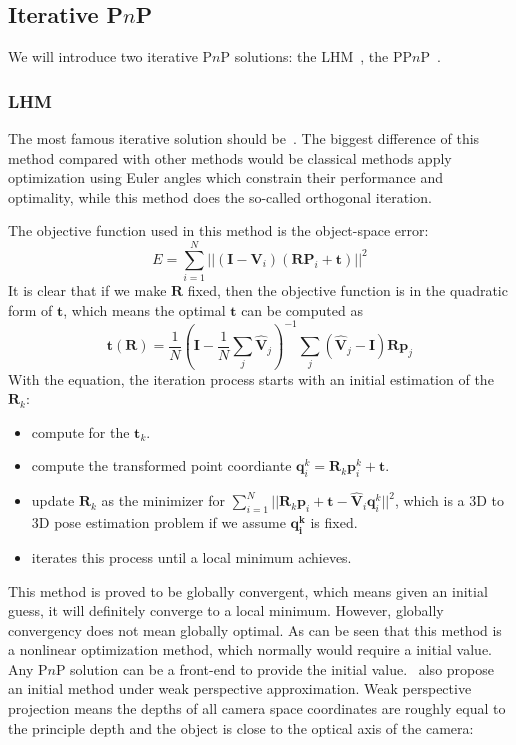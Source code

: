 \documentclass[a4paper]{article}
\begin{document}
\subsection{Iterative P$n$P}
We will introduce two iterative P$n$P solutions: the LHM~\cite{lu2000fast}, the PP$n$P~\cite{garro2012solving}.
\subsubsection{LHM}
The most famous iterative solution should be~\cite{lu2000fast}. The biggest difference of this method compared with other methods would be classical methods apply optimization using Euler angles which constrain their performance and optimality, while this method does the so-called orthogonal iteration. 

The objective function used in this method is the object-space error:
$$
E = \sum_{i=1}^{N} ||(\mathbf{I}-\mathbf{V}_i)(\mathbf{R}\mathbf{P}_i+\mathbf{t})||^2
$$
It is clear that if we make $\mathbf{R}$ fixed, then the objective function is in the quadratic form of $\mathbf{t}$, which means the optimal $\mathbf{t}$ can be computed as
$$
\mathbf{t}(\mathbf{R})=\frac{1}{N}(\mathbf{I}-\frac{1}{N}\sum_{j}\hat{\mathbf{V}}_j)^{-1} \sum_{j}(\hat{\mathbf{V}}_j-\mathbf{I})\mathbf{R}\mathbf{p}_j
$$
With the equation, the iteration process starts with an initial estimation of the $\mathbf{R}_k$:
\begin{itemize}
	\item compute for the $\mathbf{t}_k$.
	\item compute the transformed point coordiante $\mathbf{q}^k_i=\mathbf{R}_k\mathbf{p}^k_i+\mathbf{t}$.
	\item update $\mathbf{R}_k$ as the minimizer for $\sum_{i=1}^{N}||\mathbf{R}_k\mathbf{p}_i+\mathbf{t}-\hat{\mathbf{V}}_i\mathbf{q}^k_i||^2$, which is a $3$D to $3$D pose estimation problem if we assume $\mathbf{q_i^k}$ is fixed.
	\item iterates this process until a local minimum achieves.
\end{itemize}
This method is proved to be globally convergent, which means given an initial guess, it will definitely converge to a local minimum. However, globally convergency does not mean globally optimal. As can be seen that this method is a nonlinear optimization method, which normally would require a initial value. Any P$n$P solution can be a front-end to provide the initial value.~\cite{lu2000fast} also propose an initial method under weak perspective approximation. Weak perspective projection means the depths of all camera space coordinates are roughly equal to the principle depth and the object is close to the optical axis of the camera:
\end{document}
